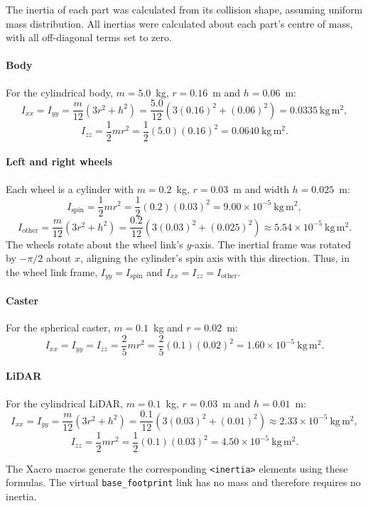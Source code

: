 \documentclass[10pt,a4paper]{article}
\begin{document}
The inertia of each part was calculated from its collision
shape, assuming uniform mass distribution. All inertias were
calculated about each part's centre of mass, with all
off-diagonal terms set to zero.

\paragraph{Body}
For the cylindrical body, $m=5.0$~kg, $r=0.16$~m and
$h=0.06$~m:
\[
I_{xx}=I_{yy}
=\frac{m}{12}(3r^2+h^2)
=\frac{5.0}{12}\left(3(0.16)^2+(0.06)^2\right)
=0.0335~\mathrm{kg\,m^2},
\]
\[
I_{zz}=\frac{1}{2}mr^2
=\frac{1}{2}(5.0)(0.16)^2
=0.0640~\mathrm{kg\,m^2}.
\]

\paragraph{Left and right wheels}
Each wheel is a cylinder with $m=0.2$~kg, $r=0.03$~m
and width $h=0.025$~m:
\[
I_{\mathrm{spin}}=\frac{1}{2}mr^2
=\frac{1}{2}(0.2)(0.03)^2
=9.00\times10^{-5}~\mathrm{kg\,m^2},
\]
\[
I_{\mathrm{other}}=\frac{m}{12}(3r^2+h^2)
=\frac{0.2}{12}\left(3(0.03)^2+(0.025)^2\right)
\approx5.54\times10^{-5}~\mathrm{kg\,m^2}.
\]
The wheels rotate about the wheel link's $y$-axis.
The inertial frame was rotated by $-\pi/2$ about $x$,
aligning the cylinder's spin axis with this direction.
Thus, in the wheel link frame, $I_{yy}=I_{\mathrm{spin}}$
and $I_{xx}=I_{zz}=I_{\mathrm{other}}$.

\paragraph{Caster}
For the spherical caster, $m=0.1$~kg and $r=0.02$~m:
\[
I_{xx}=I_{yy}=I_{zz}
=\frac{2}{5}mr^2
=\frac{2}{5}(0.1)(0.02)^2
=1.60\times10^{-5}~\mathrm{kg\,m^2}.
\]

\paragraph{LiDAR}
For the cylindrical LiDAR, $m=0.1$~kg, $r=0.03$~m
and $h=0.01$~m:
\[
I_{xx}=I_{yy}
=\frac{m}{12}(3r^2+h^2)
=\frac{0.1}{12}\left(3(0.03)^2+(0.01)^2\right)
\approx2.33\times10^{-5}~\mathrm{kg\,m^2},
\]
\[
I_{zz}=\frac{1}{2}mr^2
=\frac{1}{2}(0.1)(0.03)^2
=4.50\times10^{-5}~\mathrm{kg\,m^2}.
\]

The Xacro macros generate the corresponding
\texttt{<inertia>} elements using these formulas.
The virtual \texttt{base\_footprint} link has no mass
and therefore requires no inertia.
\end{document}
